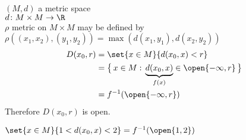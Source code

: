 $(M,d)$ a metric space \\
$d\colon M\times M\to\R$ \\
$\rho$ metric on $M\times M$ may be defined by $\rho((x_1,x_2),(y_1,y_2))=\max(d(x_1,y_1),d(x_2,y_2))$
%
\begin{align*}
D(x_0,r) &= \set{x\in M}{d(x_0,x)<r} \\
&= \bigl\{\,x\in M{}:{}\underbrace{d(x_0,x)}_{f(x)}\in\open{-\infty,r}\,\bigr\} \\
&= f^{-1}(\open{-\infty,r})
\end{align*}
Therefore $D(x_0,r)$ is open.

$\set{x\in M}{1<d(x_0,x)<2}=f^{-1}(\open{1,2})$

